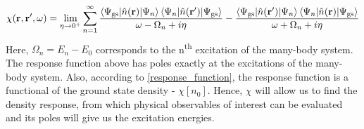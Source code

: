\begin{equation}\label{lehmann_representation}
    \chi(\mathbf{r},\mathbf{r}',\omega) = \lim_{\eta \to 0^+}\sum_{n=1}^{\infty} \frac{\mel**{\Psi_{\text{gs}}}{\hat{n}(\mathbf{r})}{\Psi_n}\mel**{\Psi_n}{\hat{n}(\mathbf{r}')}{\Psi_{\text{gs}}}}{\omega - \Omega_n + i\eta} - \frac{\mel**{\Psi_{\text{gs}}}{\hat{n}(\mathbf{r}')}{\Psi_n}\mel**{\Psi_n}{\hat{n}(\mathbf{r})}{\Psi_{\text{gs}}}}{\omega + \Omega_n + i\eta} 
\end{equation}
Here, $\Omega_n = E_n - E_0$ corresponds to the n\textsuperscript{th} excitation of the many-body system. The response function above has poles exactly at the excitations of the many-body system. Also, according to \eqref{response_function}, the response function is a functional of the ground state density - $\chi[n_0]$. Hence, $\chi$ will allow us to find the density response, from which physical observables of interest can be evaluated and its poles will give us the excitation energies. 
